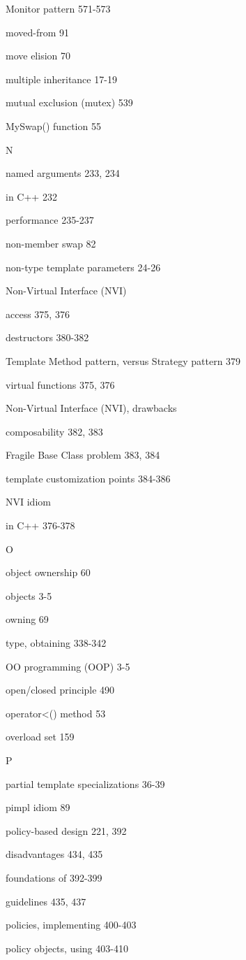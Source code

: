 Monitor pattern 571-573

moved-from 91

move elision 70

multiple inheritance 17-19

mutual exclusion (mutex) 539

MySwap() function 55

N

named arguments 233, 234

in C++ 232

performance 235-237

non-member swap 82

non-type template parameters 24-26

Non-Virtual Interface (NVI)

access 375, 376

destructors 380-382

Template Method pattern, versus Strategy pattern 379

virtual functions 375, 376

Non-Virtual Interface (NVI), drawbacks

composability 382, 383

Fragile Base Class problem 383, 384

template customization points 384-386

NVI idiom

in C++ 376-378

O

object ownership 60

objects 3-5

owning 69

type, obtaining 338-342

OO programming (OOP) 3-5

open/closed principle 490

operator\textless() method 53

overload set 159

P

partial template specializations 36-39

pimpl idiom 89

policy-based design 221, 392

disadvantages 434, 435

foundations of 392-399

guidelines 435, 437

policies, implementing 400-403

policy objects, using 403-410

